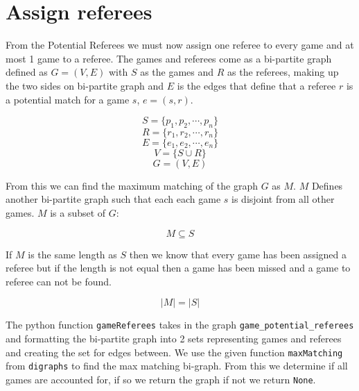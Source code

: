 \documentclass[a4paper]{article}
\begin{document}
\section{Assign referees}
From the Potential Referees we must now assign one referee to every game and at most 1 game to a referee. The games and referees come as a bi-partite graph defined as $G = (V, E)$ with $S$ as the games and $R$ as the referees, making up the two sides on bi-partite graph and $E$ is the edges that define that a referee $r$ is a potential match for a game $s$, $e = (s, r)$.
\begin{center}
\begin{Large}
\begin{equation}\label{eq:S}
    S = \{p_1, p_2, \cdots, p_n\}
\end{equation}
\begin{equation}\label{eq:R}
    R = \{r_1, r_2, \cdots, r_n\}
\end{equation}
\begin{equation}\label{eq:E}
    E = \{e_1, e_2, \cdots, e_n\}
\end{equation}
\begin{equation}\label{eq:E}
    V = \{S \cup R\}
\end{equation}
\begin{equation}\label{eq:E}
    G = (V, E)
\end{equation}
\end{Large}
\end{center}
From this we can find the maximum matching of the graph $G$ as $M$. $M$ Defines another bi-partite graph such that each each game $s$ is disjoint from all other games. $M$ is a subset of $G$:
\begin{center}
\begin{Large}
\begin{equation}\label{eq:ES}
    M \subseteq S
\end{equation}
\end{Large}
\end{center}
If $M$ is the same length as $S$ then we know that every game has been assigned a referee but if the length is not equal then a game has been missed and a game to referee can not be found.
\begin{center}
\begin{Large}
\begin{equation}\label{eq:EM}
    |M| = |S|
\end{equation}
\end{Large}
\end{center}
The python function \verb+gameReferees+ takes in the graph \verb+game_potential_referees+ and formatting the bi-partite graph into 2 sets representing games and referees and creating the set for edges between. We use the given function \verb+maxMatching+ from \verb+digraphs+ to find the max matching bi-graph. From this we determine if all games are accounted for, if so we return the graph if not we return \verb+None+.
\end{document}

